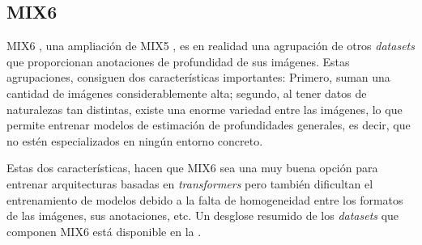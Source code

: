 \subsection{MIX6}\label{mix6}
MIX6 \cite{visiontransformersDPT}, una ampliación de MIX5 \cite{midas-intel}, es en realidad una agrupación de otros \textit{datasets} que proporcionan anotaciones de profundidad de sus imágenes. Estas agrupaciones, consiguen dos características importantes: Primero, suman una cantidad de imágenes considerablemente alta; segundo, al tener datos de naturalezas tan distintas, existe una enorme variedad entre las imágenes, lo que permite entrenar modelos de estimación de profundidades generales, es decir, que no estén especializados en ningún entorno concreto. 

Estas dos características, hacen que MIX6 sea una muy buena opción para entrenar arquitecturas basadas en \textit{transformers} pero también dificultan el entrenamiento de modelos debido a la falta de homogeneidad entre los formatos de las imágenes, sus anotaciones, etc. Un desglose resumido de los \textit{datasets} que componen MIX6 está disponible en la .

